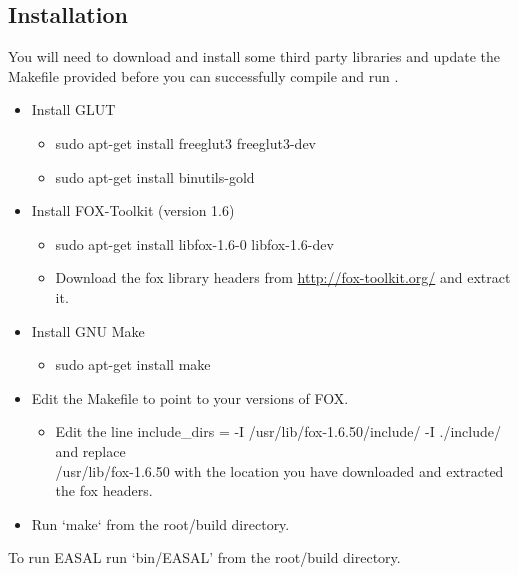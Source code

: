 \documentclass[10pt]{article}
\begin{document}
\subsection{Installation}
You will need to download and install some third party libraries and update the Makefile provided before you can successfully compile and run \EASAL.  
\begin{itemize}
	\item Install GLUT 
	  \begin{itemize}
	  	  \item sudo apt-get install freeglut3 freeglut3-dev
	  	  \item sudo apt-get install binutils-gold
	  \end{itemize}
     \item Install FOX-Toolkit (version 1.6)
	   \begin{itemize}
	   	   \item sudo apt-get install libfox-1.6-0 libfox-1.6-dev
		   \item Download the fox library headers from \url{http://fox-toolkit.org/} and extract it.
	   \end{itemize}
	 \item Install GNU Make
	   \begin{itemize}
	   	   \item sudo apt-get install make
		   \end{itemize}
	 \item Edit the Makefile to point to your versions of FOX.
	   \begin{itemize}
	   	   \item Edit the line 
	   	   	 include\_dirs = -I /usr/lib/fox-1.6.50/include/ -I ./include/\\
	   	   	 and replace \\
	   	   	 /usr/lib/fox-1.6.50 with the location you have downloaded and extracted the fox headers.
		\end{itemize}
	 \item Run `make` from the root/build directory.
\end{itemize}

To run EASAL run `bin/EASAL' from the root/build directory.
 




\end{document}
